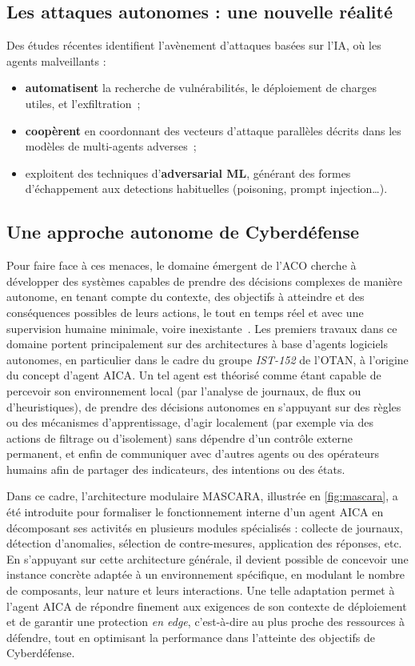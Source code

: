 \subsection*{Les attaques autonomes : une nouvelle réalité}

Des études récentes identifient l'avènement d'attaques basées sur l'\ac{IA}, où les agents malveillants :
\begin{itemize}
    \item \textbf{automatisent} la recherche de vulnérabilités, le déploiement de charges utiles, et l'exfiltration~\cite{AutoAttacker2024};
    \item \textbf{coopèrent} en coordonnant des vecteurs d'attaque parallèles décrits dans les modèles de multi-agents adverses~\cite{Falong2025};
    \item exploitent des techniques d'\textbf{adversarial ML}, générant des formes d'échappement aux detections habituelles (poisoning, prompt injection…).
\end{itemize}

\subsection*{Une approche autonome de Cyberdéfense}

Pour faire face à ces menaces, le domaine émergent de l'\ac{ACO} cherche à développer des systèmes capables de prendre des décisions complexes de manière autonome, en tenant compte du contexte, des objectifs à atteindre et des conséquences possibles de leurs actions, le tout en temps réel et avec une supervision humaine minimale, voire inexistante~\cite{Vyas2023}. Les premiers travaux dans ce domaine portent principalement sur des architectures à base d'agents logiciels autonomes, en particulier dans le cadre du groupe \textit{IST-152} de l'\ac{OTAN}, à l'origine du concept d'agent \ac{AICA}.
Un tel agent est théorisé comme étant capable de percevoir son environnement local (par l'analyse de journaux, de flux ou d'heuristiques), de prendre des décisions autonomes en s'appuyant sur des règles ou des mécanismes d'apprentissage, d'agir localement (par exemple via des actions de filtrage ou d'isolement) sans dépendre d'un contrôle externe permanent, et enfin de communiquer avec d'autres agents ou des opérateurs humains afin de partager des indicateurs, des intentions ou des états.

Dans ce cadre, l'architecture modulaire \ac{MASCARA}, illustrée en \autoref{fig:mascara}, a été introduite pour formaliser le fonctionnement interne d'un agent \ac{AICA} en décomposant ses activités en plusieurs modules spécialisés : collecte de journaux, détection d'anomalies, sélection de contre-mesures, application des réponses, etc. En s'appuyant sur cette architecture générale, il devient possible de concevoir une instance concrète adaptée à un environnement spécifique, en modulant le nombre de composants, leur nature et leurs interactions. Une telle adaptation permet à l'agent \ac{AICA} de répondre finement aux exigences de son contexte de déploiement et de garantir une protection {\em en edge}, c'est-à-dire au plus proche des ressources à défendre, tout en optimisant la performance dans l'atteinte des objectifs de Cyberdéfense.

